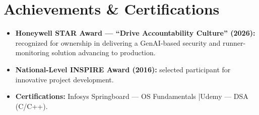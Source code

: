 \documentclass[a4paper,11pt]{article}
\newcommand{\resumeItem}[1]{
  \item\small{{#1 \vspace{-1pt}}}
}
\newcommand{\resumeItemListStart}{\begin{itemize}[leftmargin=0.3in, itemsep=2pt, topsep=3pt, parsep=0pt]}
\newcommand{\resumeItemListEnd}{\end{itemize}\vspace{0pt}}
\begin{document}
\section{Achievements \& Certifications}
  \resumeItemListStart
    \resumeItem{\textbf{Honeywell STAR Award --- ``Drive Accountability Culture'' (2026):} recognized for ownership in delivering a GenAI-based security and runner-monitoring solution advancing to production.}
    \resumeItem{\textbf{National-Level INSPIRE Award (2016):} selected participant for innovative project development.}
    \resumeItem{\textbf{Certifications:} Infosys Springboard --- OS Fundamentals \quad|\quad Udemy --- DSA (C/C++).}
  \resumeItemListEnd
\end{document}
